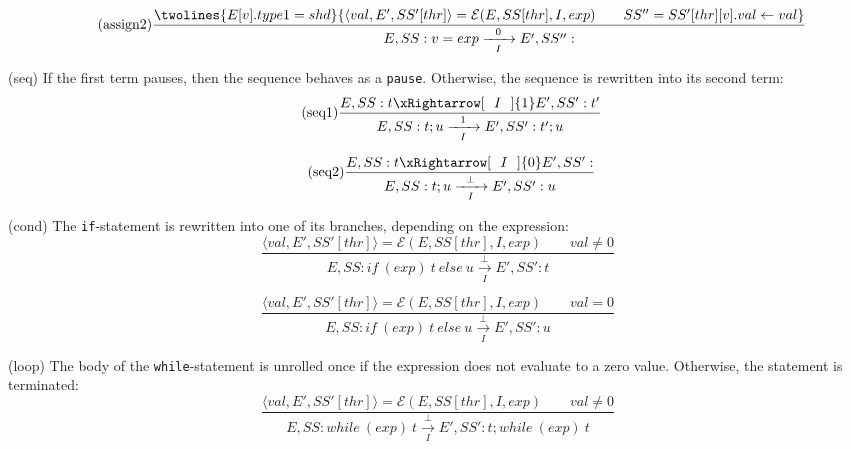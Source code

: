 \begin{equation*}
	\tag{assign2}
	\label{forec:assign2}
	\frac{
		\twolines{
				E[v].type1 = shd
			}{
				\langle val, E', SS'[thr] \rangle = \mathcal{E}(E, SS[thr], I, exp)
				\qquad
				SS'' = SS'[thr][v].val \gets val
			}
		}{
			E, SS: v = exp 
				\xrightarrow[~~I~~]{0} 
			E', SS'': 
		}
\end{equation*}

\noindent(seq) If the first term pauses, then the sequence 
behaves as a \verb$pause$. Otherwise, the sequence is rewritten into its 
second term:
\begin{equation*}
	\tag{seq1}
	\label{forec:seq1}
	\frac{
			E, SS: t 
				\xRightarrow[~~I~~]{1} 
			E', SS': t'
		}{
			E, SS: t;u 
				\xrightarrow[~~I~~]{1} 
			E', SS': t';u
		}
\end{equation*}

\begin{equation*}
	\tag{seq2}
	\label{forec:seq2}
	\frac{
			E, SS: t
				\xRightarrow[~~I~~]{0} 
			E', SS': 
		}{
			E, SS: t;u 
				\xrightarrow[~~I~~]{\bot} 
			E', SS': u
		}
\end{equation*}

\noindent (cond) The \verb$if$-statement is rewritten into one of 
its branches, depending on the expression:
\begin{equation*}
	\tag{cond1}
	\label{forec:cond1}
	\frac{
			\langle val, E', SS'[thr] \rangle = \mathcal{E}(E, SS[thr], I, exp)
			\qquad
			val \neq 0
		}{
			E, SS: if~(exp)~t~else~u
				\xrightarrow[~~I~~]{\bot} 
			E', SS': t
		}
\end{equation*}

\begin{equation*}
	\tag{cond2}
	\label{forec:cond2}
	\frac{
			\langle val, E', SS'[thr] \rangle = \mathcal{E}(E, SS[thr], I, exp)
			\qquad
			val = 0 
		}{
			E, SS: if~(exp)~t~else~u
				\xrightarrow[~~I~~]{\bot} 
			E', SS': u
		}
\end{equation*}

\noindent (loop) The body of the \verb$while$-statement is unrolled 
once if the expression does not evaluate to a zero value. Otherwise, 
the statement is terminated:
\begin{equation*}
	\tag{loop1}
	\label{forec:loop1}
	\frac{
			\langle val, E', SS'[thr] \rangle = \mathcal{E}(E, SS[thr], I, exp)
			\qquad
			val \neq 0
		}{
			E, SS: while~(exp)~t
				\xrightarrow[~~I~~]{\bot} 
			E', SS': t; while~(exp)~t
		}
\end{equation*}

